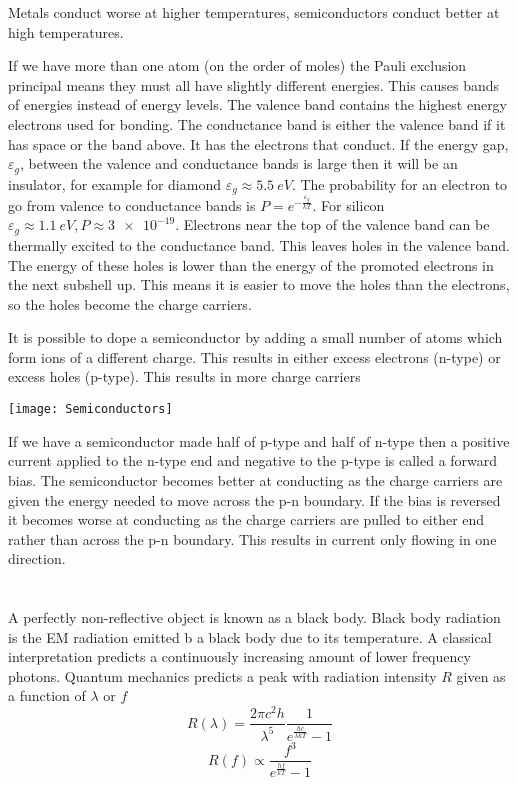 Metals conduct worse at higher temperatures, semiconductors conduct better at high temperatures.

If we have more than one atom (on the order of moles) the Pauli exclusion principal means they must all have slightly different energies. This causes bands of energies instead of energy levels. The valence band contains the highest energy electrons used for bonding. The conductance band is either the valence band if it has space or the band above. It has the electrons that conduct. If the energy gap, \(\varepsilon_g\), between the valence and conductance bands is large then it will be an insulator, for example for diamond \(\varepsilon_g\approx \SI{5.5}{eV}\). The probability for an electron to go from valence to conductance bands is \(P=e^{-\frac{\varepsilon_g}{kT}}\). For silicon \(\varepsilon_g\approx \SI{1.1}{eV},P\approx\num{3e-19}\). Electrons near the top of the valence band can be thermally excited to the conductance band. This leaves holes in the valence band. The energy of these holes is lower than the energy of the promoted electrons in the next subshell up. This means it is easier to move the holes than the electrons, so the holes become the charge carriers.

It is possible to dope a semiconductor by adding a small number of atoms which form ions of a different charge. This results in either excess electrons (n-type) or excess holes (p-type). This results in more charge carriers

\begin{center}
\texttt{[image: Semiconductors]}
\end{center}

If we have a semiconductor made half of p-type and half of n-type then a positive current applied to the n-type end and negative to the p-type is called a forward bias. The semiconductor becomes better at conducting as the charge carriers are given the energy needed to move across the p-n boundary. If the bias is reversed it becomes worse at conducting as the charge carriers are pulled to either end rather than across the p-n boundary. This results in current only flowing in one direction.

\section{}

A perfectly non-reflective object is known as a black body. Black body radiation is the EM radiation emitted b a black body due to its temperature. A classical interpretation predicts a continuously increasing amount of lower frequency photons. Quantum mechanics predicts a peak with radiation intensity \(R\) given as a function of \(\lambda\) or \(f\)
\[R(\lambda)=\frac{2\pi c^2h}{\lambda^5}\frac{1}{e^{\frac{hc}{\lambda kT}}-1}\]
\[R(f)\propto \frac{f^3}{e^{\frac{hf}{kT}}-1}\]

